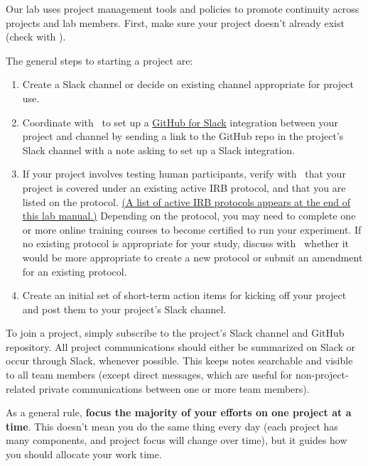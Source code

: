 \documentclass{tufte-book} %
\begin{document}

\noindent
Our lab uses project management tools and policies to
promote continuity across projects and lab members.  First, make sure
your project doesn't already exist (check with \director).


The general steps to starting a project are:
\begin{enumerate}

\item Create a Slack channel or decide on existing channel appropriate
  for project use.  
\item Coordinate with \director~to set up a
  \href{https://get.slack.help/hc/en-us/articles/232289568-GitHub-for-Slack}{GitHub
    for Slack} integration between your project and channel by sending
  a link to the GitHub repo in the project's Slack channel with a note
  asking to set up a Slack integration.
\item If your project involves testing human participants, verify with
  \director~that your project is covered under an existing active IRB
  protocol, and that you are listed on the protocol.
  \hyperref[ch:irb]{(A list of active IRB protocols appears at the end
    of this lab manual.)}  Depending on the protocol, you may need to
  complete one or more online training courses to become certified to
  run your experiment.  If no existing protocol is appropriate for
  your study, discuss with \director~whether it would be more
  appropriate to create a new protocol or submit an amendment for an
  existing protocol.
\item Create an initial set of short-term action items for kicking off
  your project and post them to your project's Slack channel.
\end{enumerate}




\noindent To join a project, simply subscribe to the project's Slack
channel and GitHub repository.  All project communications should
either be summarized on Slack or occur through Slack, whenever
possible.  This keeps notes searchable and visible to all team members
(except direct messages, which are useful for non-project-related
private communications between one or more team members).

As a general rule, \textbf{focus the majority of your
efforts on one project at a time}.  This doesn't mean you do
the same thing every day (each project has many components, and
project focus will change over time), but
it guides how you should allocate your work time.
\end{document}
